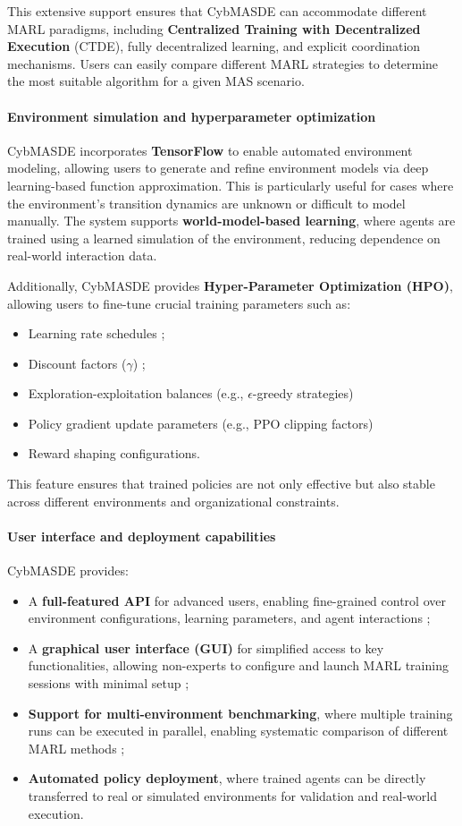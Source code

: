 \documentclass[journal]{IEEEtai}
\begin{document}
This extensive support ensures that CybMASDE can accommodate different MARL paradigms, including \textbf{Centralized Training with Decentralized Execution} (CTDE), fully decentralized learning, and explicit coordination mechanisms. Users can easily compare different MARL strategies to determine the most suitable algorithm for a given MAS scenario.

\paragraph{Environment simulation and hyperparameter optimization} 
CybMASDE incorporates \textbf{TensorFlow} to enable automated environment modeling, allowing users to generate and refine environment models via deep learning-based function approximation. This is particularly useful for cases where the environment's transition dynamics are unknown or difficult to model manually. The system supports \textbf{world-model-based learning}, where agents are trained using a learned simulation of the environment, reducing dependence on real-world interaction data.

Additionally, CybMASDE provides \textbf{Hyper-Parameter Optimization (HPO)}, allowing users to fine-tune crucial training parameters such as:
\begin{itemize}
    \item Learning rate schedules ;
    \item Discount factors ($\gamma$) ;
    \item Exploration-exploitation balances (e.g., $\epsilon$-greedy strategies)
    \item Policy gradient update parameters (e.g., PPO clipping factors)
    \item Reward shaping configurations.
\end{itemize}

This feature ensures that trained policies are not only effective but also stable across different environments and organizational constraints.

\paragraph{User interface and deployment capabilities} 
CybMASDE provides:
\begin{itemize}
    \item A \textbf{full-featured API} for advanced users, enabling fine-grained control over environment configurations, learning parameters, and agent interactions ;
    \item A \textbf{graphical user interface (GUI)} for simplified access to key functionalities, allowing non-experts to configure and launch MARL training sessions with minimal setup ;
    \item \textbf{Support for multi-environment benchmarking}, where multiple training runs can be executed in parallel, enabling systematic comparison of different MARL methods ;
    \item \textbf{Automated policy deployment}, where trained agents can be directly transferred to real or simulated environments for validation and real-world execution.
\end{itemize}
\end{document}

